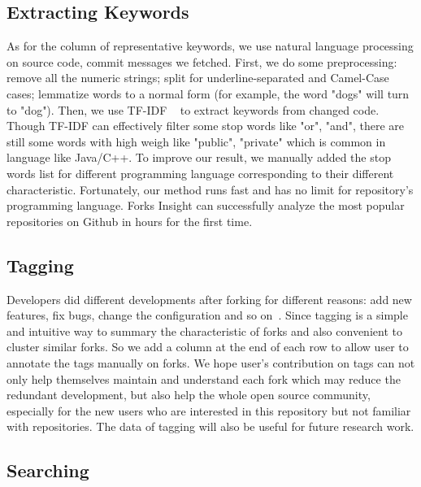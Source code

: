 \subsection{Extracting Keywords}
As for the column of representative keywords, we use natural language processing on source code, commit messages we fetched. First, we do some preprocessing: remove all the numeric strings; split for underline-separated and Camel-Case cases; lemmatize words to a normal form (for example, the word "dogs" will turn to "dog"). Then, we use TF-IDF ~\cite{salton1988term} to extract keywords from changed code. Though TF-IDF can effectively filter some stop words like "or", "and", there are still some words with high weigh like "public", "private" which is common in language like Java/C++. To improve our result, we manually added the stop words list for different programming language corresponding to their different characteristic.
Fortunately, our method runs fast and has no limit for repository's programming language. Forks Insight can successfully analyze the most popular repositories on Github in hours for the first time.

\subsection{Tagging}
Developers did different developments after forking for different reasons: add new features, fix bugs, change the configuration and so on~\cite{Mikkonen2011,Robles2012,dubinsky2013exploratory,stanciulescu2015forked}.
Since tagging is a simple and intuitive way to summary the characteristic of forks and also convenient to cluster similar forks. So we add a column at the end of each row to allow user to annotate the tags manually on forks. We hope user's contribution on tags can not only help themselves maintain and understand each fork which may reduce the redundant development, but also help the whole open source community, especially for the new users who are interested in this repository but not familiar with repositories. The data of tagging will also be useful for future research work.

\subsection{Searching}

